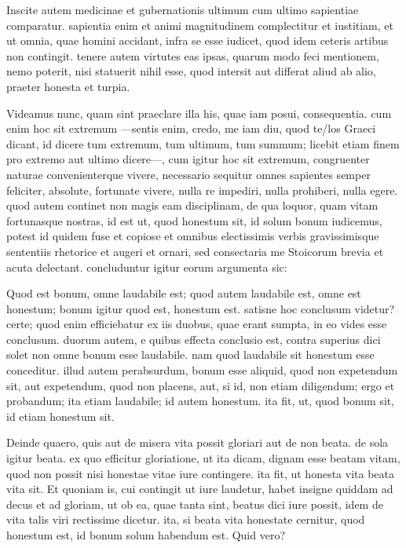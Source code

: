  Inscite autem medicinae et gubernationis ultimum cum ultimo sapientiae comparatur. sapientia enim et animi magnitudinem complectitur et iustitiam, et ut omnia, quae homini accidant, infra se esse iudicet, quod idem ceteris artibus non contingit. tenere autem virtutes eas ipsas, quarum modo feci mentionem, nemo poterit, nisi statuerit nihil esse, quod intersit aut differat aliud ab alio, praeter honesta et turpia.

 Videamus nunc, quam sint praeclare illa his, quae iam posui, consequentia. cum enim hoc sit extremum —sentis enim, credo, me iam diu, quod te/los Graeci dicant, id dicere tum extremum, tum ultimum, tum summum; licebit etiam finem pro extremo aut ultimo dicere—, cum igitur hoc sit extremum, congruenter naturae convenienterque vivere, necessario sequitur omnes sapientes semper feliciter, absolute, fortunate vivere, nulla re impediri, nulla prohiberi, nulla egere. quod autem continet non magis eam disciplinam, de qua loquor, quam vitam fortunasque nostras, id est ut, quod honestum sit, id solum bonum iudicemus, potest id quidem fuse et copiose et omnibus electissimis verbis gravissimisque sententiis rhetorice et augeri et ornari, sed consectaria me Stoicorum brevia et acuta delectant. concluduntur igitur eorum argumenta sic:

 Quod est bonum, omne laudabile est; quod autem laudabile est, omne est honestum; bonum igitur quod est, honestum est. satisne hoc conclusum videtur? certe; quod enim efficiebatur ex iis duobus, quae erant sumpta, in eo vides esse conclusum. duorum autem, e quibus effecta conclusio est, contra superius dici solet non omne bonum esse laudabile. nam quod laudabile sit honestum esse conceditur. illud autem perabsurdum, bonum esse aliquid, quod non expetendum sit, aut expetendum, quod non placens, aut, si id, non etiam diligendum; ergo et probandum; ita etiam laudabile; id autem honestum. ita fit, ut, quod bonum sit, id etiam honestum sit.

 Deinde quaero, quis aut de misera vita possit gloriari aut de non beata. de sola igitur beata. ex quo efficitur gloriatione, ut ita dicam, dignam esse beatam vitam, quod non possit nisi honestae vitae iure contingere. ita fit, ut honesta vita beata vita sit. Et quoniam is, cui contingit ut iure laudetur, habet insigne quiddam ad decus et ad gloriam, ut ob ea, quae tanta sint, beatus dici iure possit, idem de vita talis viri rectissime dicetur. ita, si beata vita honestate cernitur, quod honestum est, id bonum solum habendum est. Quid vero?

